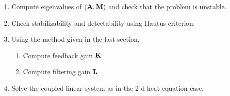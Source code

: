 \documentclass[12pt]{article}
\begin{document}
\begin{enumerate}
\item Compute eigenvalues of $({\mathbf A},{\mathbf M})$ and check that the problem is unstable.
\item Check stabilizability and detectability using Hautus criterion.

\item Using the method given in the last section,
\begin{enumerate}

\item Compute feedback gain ${\mathbf K}$

\item Compute filtering gain ${\mathbf L}$
\end{enumerate}

\item Solve the coupled linear system as in the 2-d heat equation case.






\end{enumerate}


\end{document}
